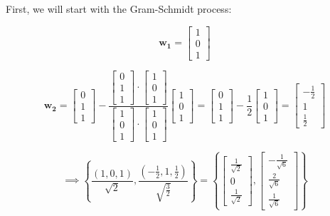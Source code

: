 \documentclass{report}
\begin{document}
First, we will start with the Gram-Schmidt process:

$$
\bm{w_1} = \begin{bmatrix} 1 \\ 0 \\ 1 \end{bmatrix}
$$

$$
\bm{w_2} = \begin{bmatrix} 0 \\ 1 \\ 1  \end{bmatrix} - \frac{\begin{bmatrix} 0 \\ 1 \\ 1 \end{bmatrix} \cdot \begin{bmatrix} 1 \\ 0 \\ 1 \end{bmatrix}}{\begin{bmatrix} 1 \\ 0 \\ 1 \end{bmatrix} \cdot \begin{bmatrix} 1 \\ 0 \\ 1 \end{bmatrix}} \begin{bmatrix} 1 \\ 0 \\ 1 	\end{bmatrix} = \begin{bmatrix} 0 \\ 1 \\ 1 \end{bmatrix} - \frac{1}{2} \begin{bmatrix} 1 \\ 0 \\ 1 \end{bmatrix} = \begin{bmatrix} -\frac{1}{2} \\ 1 \\ \frac{1}{2} \end{bmatrix}
$$

$$
\implies \left\{ \frac{(1,0,1)}{\sqrt{2}}, \frac{\left( -\frac{1}{2},1,\frac{1}{2}\right)}{\sqrt{\frac{3}{2}}} \right\} = \left\{ \begin{bmatrix} \frac{1}{\sqrt{2}} \\ 0 \\ \frac{1}{\sqrt{2}} \end{bmatrix}, \begin{bmatrix} - \frac{1}{\sqrt{6}} \\ \frac{2}{\sqrt{6}} \\ \frac{1}{\sqrt{6}} \end{bmatrix} \right\}
$$
\end{document}
